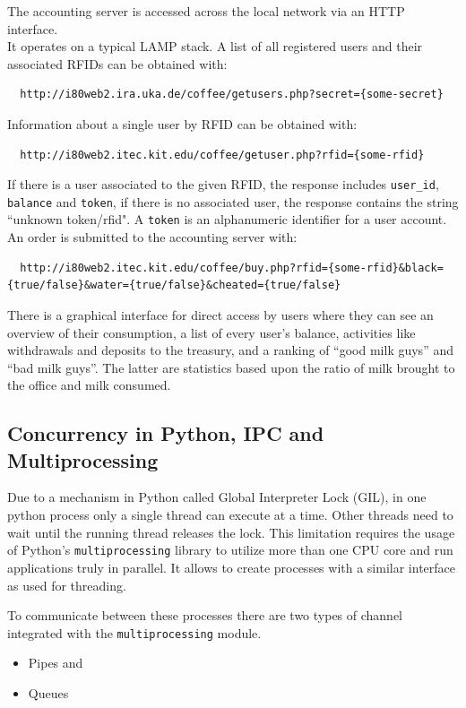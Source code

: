 \documentclass[12pt]{article}
\begin{document}
The accounting server is accessed across the local network via an HTTP interface.\\
It operates on a typical LAMP stack.
A list of all registered users and their associated RFIDs can be obtained with:
\begin{lstlisting}
  http://i80web2.ira.uka.de/coffee/getusers.php?secret={some-secret}
  \end{lstlisting}
Information about a single user by RFID can be obtained with:
\begin{lstlisting}
  http://i80web2.itec.kit.edu/coffee/getuser.php?rfid={some-rfid}
  \end{lstlisting}
If there is a user associated to the given RFID, the response includes \texttt{user\_id}, \texttt{balance} and \texttt{token},
if there is no associated user, the response contains the string ``unknown token/rfid".
A \texttt{token} is an alphanumeric identifier for a user account. \\
An order is submitted to the accounting server with:
\begin{lstlisting}
  http://i80web2.itec.kit.edu/coffee/buy.php?rfid={some-rfid}&black={true/false}&water={true/false}&cheated={true/false}
  \end{lstlisting}

There is a graphical interface for direct access by users where they can see an overview of their consumption,
a list of every user's balance, activities like withdrawals and deposits to the treasury, and a ranking of ``good milk guys'' and ``bad milk guys''.
The latter are statistics based upon the ratio of milk brought to the office and milk consumed.

\subsection{Concurrency in Python, IPC and Multiprocessing}
Due to a mechanism in Python called Global Interpreter Lock (GIL),
in one python process only a single thread can execute at a time.
Other threads need to wait until the running thread releases the lock.
This limitation requires the usage of Python's \texttt{multiprocessing} library
to utilize more than one CPU core and run applications truly in parallel.
It allows to create processes with a similar interface as used for threading.

To communicate between these processes there are two types of channel integrated with the \texttt{multiprocessing} module.
\begin{itemize}
  \item Pipes and
  \item Queues
\end{itemize}
\end{document}
